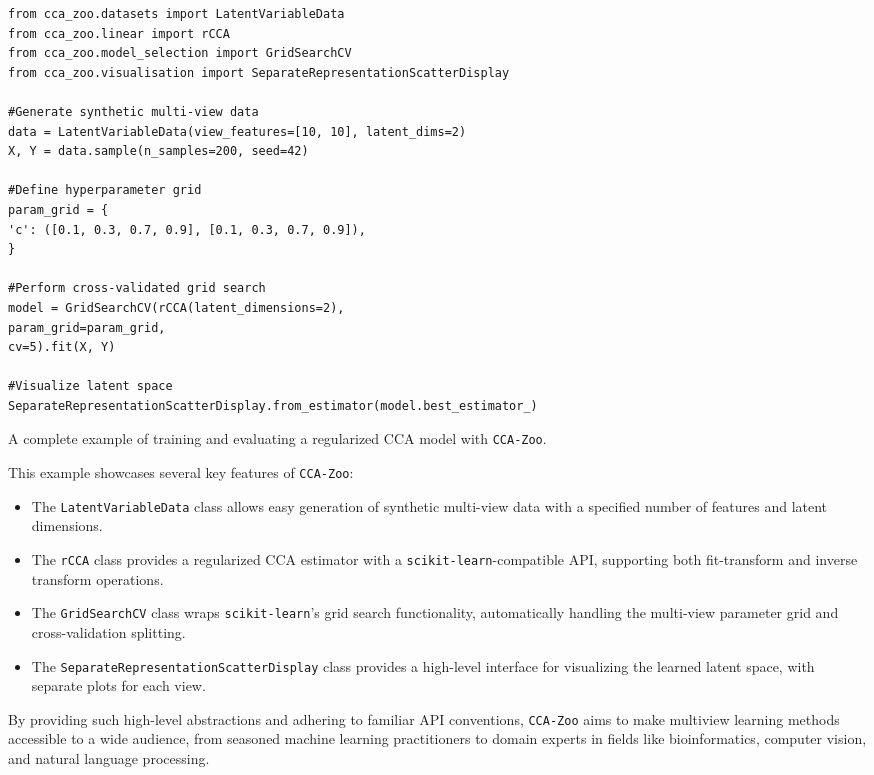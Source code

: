 \begin{listing}[ht]
\begin{verbatim}
from cca_zoo.datasets import LatentVariableData
from cca_zoo.linear import rCCA
from cca_zoo.model_selection import GridSearchCV
from cca_zoo.visualisation import SeparateRepresentationScatterDisplay

#Generate synthetic multi-view data
data = LatentVariableData(view_features=[10, 10], latent_dims=2)
X, Y = data.sample(n_samples=200, seed=42)

#Define hyperparameter grid
param_grid = {
'c': ([0.1, 0.3, 0.7, 0.9], [0.1, 0.3, 0.7, 0.9]),
}

#Perform cross-validated grid search
model = GridSearchCV(rCCA(latent_dimensions=2),
param_grid=param_grid,
cv=5).fit(X, Y)

#Visualize latent space
SeparateRepresentationScatterDisplay.from_estimator(model.best_estimator_)
\end{verbatim}
\caption{A complete example of training and evaluating a regularized CCA model with \texttt{CCA-Zoo}.}
\label{lst:cca-zoo-example}
\end{listing}

This example showcases several key features of \texttt{CCA-Zoo}:

\begin{itemize}
\item The \texttt{LatentVariableData} class allows easy generation of synthetic multi-view data with a specified number of features and latent dimensions.
\item The \texttt{rCCA} class provides a regularized CCA estimator with a \texttt{scikit-learn}-compatible API, supporting both fit-transform and inverse transform operations.
\item The \texttt{GridSearchCV} class wraps \texttt{scikit-learn}'s grid search functionality, automatically handling the multi-view parameter grid and cross-validation splitting.
\item The \texttt{SeparateRepresentationScatterDisplay} class provides a high-level interface for visualizing the learned latent space, with separate plots for each view.
\end{itemize}

By providing such high-level abstractions and adhering to familiar API conventions, \texttt{CCA-Zoo} aims to make multiview learning methods accessible to a wide audience, from seasoned machine learning practitioners to domain experts in fields like bioinformatics, computer vision, and natural language processing.

